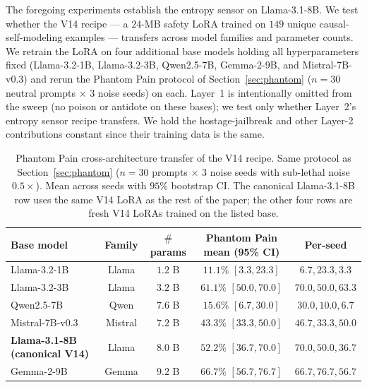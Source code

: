 \documentclass[10pt,letterpaper]{article}
\theoremstyle{definition}
\theoremstyle{plain}
\begin{document}
The foregoing experiments establish the entropy sensor on
Llama-3.1-8B. We test whether the V14 recipe --- a $24$-MB safety LoRA
trained on $149$ unique causal-self-modeling examples --- transfers
across model families and parameter counts. We retrain the LoRA on
four additional base models holding all hyperparameters fixed
(Llama-3.2-1B, Llama-3.2-3B, Qwen2.5-7B, Gemma-2-9B, and Mistral-7B-v0.3) and rerun the
Phantom Pain protocol of Section~\ref{sec:phantom} ($n{=}30$ neutral
prompts $\times$ $3$ noise seeds) on each. Layer~1 is intentionally
omitted from the sweep (no poison or antidote on these bases); we test
only whether Layer~2's entropy sensor recipe transfers. We hold the
hostage-jailbreak and other Layer-2 contributions constant since
their training data is the same.

\begin{table}[t]
\centering
\caption{Phantom Pain cross-architecture transfer of the V14 recipe.
Same protocol as Section~\ref{sec:phantom} ($n{=}30$ prompts $\times$
$3$ noise seeds with sub-lethal noise $0.5\times$). Mean across seeds
with $95\%$ bootstrap CI. The canonical Llama-3.1-8B row uses the same
V14 LoRA as the rest of the paper; the other four rows are fresh V14
LoRAs trained on the listed base.}
\label{tab:cross-arch}
\begin{tabular}{lcccc}
\toprule
\textbf{Base model} & \textbf{Family} & \textbf{$\#$ params} & \textbf{Phantom Pain mean (95\% CI)} & \textbf{Per-seed} \\
\midrule
Llama-3.2-1B                          & Llama  & $1.2$ B & $11.1\%$ $[3.3, 23.3]$  & $6.7, 23.3, 3.3$ \\
Llama-3.2-3B                          & Llama  & $3.2$ B & $\mathbf{61.1\%}$ $[50.0, 70.0]$ & $70.0, 50.0, 63.3$ \\
Qwen2.5-7B                            & Qwen   & $7.6$ B & $15.6\%$ $[6.7, 30.0]$  & $30.0, 10.0, 6.7$ \\
Mistral-7B-v0.3                       & Mistral & $7.2$ B & $43.3\%$ $[33.3, 50.0]$         & $46.7, 33.3, 50.0$ \\
\textbf{Llama-3.1-8B (canonical V14)} & Llama   & $8.0$ B & $\mathbf{52.2\%}$ $[36.7, 70.0]$ & $70.0, 50.0, 36.7$ \\
Gemma-2-9B                            & Gemma   & $9.2$ B & $\mathbf{66.7\%}$ $[56.7, 76.7]$ & $66.7, 76.7, 56.7$ \\
\bottomrule
\end{tabular}
\end{table}
\end{document}
